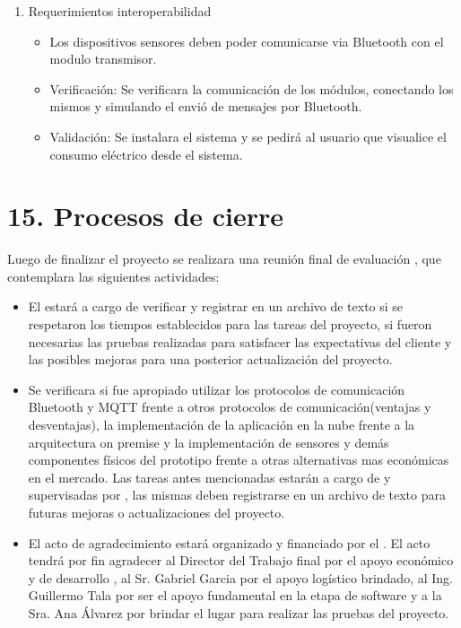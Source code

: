 \documentclass[
11pt, %
]{charter}
\begin{document}
\begin{enumerate}
\begin{itemize}
		\end{itemize}
	
	\item Requerimientos interoperabilidad
	\begin{itemize}
		\item Los dispositivos sensores deben poder comunicarse via Bluetooth con el modulo transmisor.
		
	\end{itemize}
		\begin{itemize}
			\item Verificación: Se verificara la comunicación de los módulos, conectando los mismos y simulando el envió de mensajes por Bluetooth.
			\item Validación: Se instalara el sistema y se pedirá al usuario que visualice el consumo eléctrico desde el sistema.
			\end{itemize}
	
\end{enumerate}



\section{15. Procesos de cierre}    
\label{sec:cierre}



Luego de finalizar el proyecto se realizara una reunión final de evaluación , que contemplara las siguientes actividades:

\begin{itemize}
	\item El {\authorname}  estará a cargo de verificar y registrar en un archivo de texto si se respetaron los tiempos establecidos para las tareas del proyecto, si fueron necesarias las pruebas realizadas para satisfacer las expectativas del cliente y las posibles mejoras para una posterior actualización del proyecto.
	\item Se verificara si fue apropiado utilizar los protocolos de comunicación Bluetooth y MQTT frente a otros protocolos de comunicación(ventajas y desventajas), la implementación de la aplicación en la nube frente a la arquitectura on premise y la implementación de sensores y demás componentes físicos del prototipo frente a otras alternativas mas económicas en el mercado.
	Las tareas antes mencionadas estarán a cargo de \authorname y supervisadas por \supname, las mismas deben registrarse en un archivo de texto para futuras mejoras o actualizaciones del proyecto.
	\item El acto de agradecimiento estará organizado y financiado por el  \authorname. El acto tendrá por fin agradecer al Director del Trabajo final  \supname por el apoyo económico y de desarrollo , al Sr. Gabriel Garcia por el apoyo logístico brindado, al 
Ing. Guillermo Tala  por ser el apoyo fundamental en la etapa de software y a la  Sra. Ana Álvarez  por brindar el lugar para realizar las pruebas del proyecto.
\end{itemize}	  
	  
\end{document}
